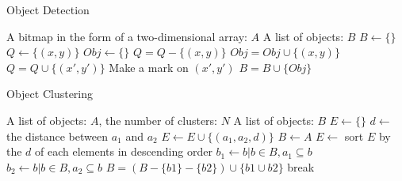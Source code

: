 \documentclass[11pt]{article}
\begin{document}
  
    \begin{algorithm}  
        \caption{Object Detection}  
        \begin{algorithmic} %
            \Require A bitmap in the form of a two-dimensional array: $A$
            \Ensure A list of objects: $B$
            \State $B \gets \{\}$
                    \State $Q \gets \{(x,y)\} $
                    \State $Obj \gets \{\}$
                        \State $Q = Q - \{(x,y)\}$
                        \State $Obj = Obj \cup \{(x,y)\}$
                                \State $Q = Q \cup \{(x',y')\}$
                                \State Make a mark on $(x',y')$
                            \EndIf
                        \EndFor
                    \EndFor
                    \State $B = B \cup \{Obj\}$
                \EndIf
            \EndFor
            \State {}
        \end{algorithmic}  
    \end{algorithm} 
    \begin{algorithm}  
        \caption{Object Clustering}  
        \begin{algorithmic} %
            \Require A list of objects: $A$, the number of clusters: $N$
            \Ensure A list of objects: $B$
            \State $E \gets \{\}$
                 
                        \State $d \gets$ the distance between $a_1$ and $a_2$
                        \State $E \gets E \cup \{(a_1, a_2, d)\}$
                    \EndIf
                \EndFor
            \EndFor
            \State $B \gets A$
            \State $E \gets$ sort $E$ by the $d$ of each elements in descending order
                \State $b_1 \gets b|b\in B, a_1 \subseteq b$
                \State $b_2 \gets b|b\in B, a_2 \subseteq b$
                    \State $B = (B - \{b1\} - \{b2\})\cup \{b1 \cup b2\}$
                \EndIf
                    \State break
                \EndIf
            \EndFor
            \State {}
        \end{algorithmic}  
    \end{algorithm} 
\end{document}
